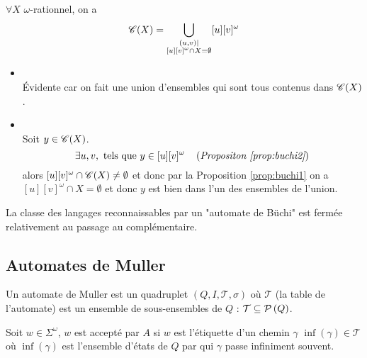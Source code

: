 \begin{theorem}
	$\forall X$ $\omega$-rationnel, on a
	$$ \mathscr{C}(X) = \bigcup_{ \substack{ (u,v) \mid \\ [u][v]^{\omega} \cap X = \emptyset} } [u][v]^{\omega}$$
\end{theorem}

\begin{proofI}
	\begin{itemize}
		\item \fbox{$\supseteq$} \\
		      Évidente car on fait une union d'ensembles qui sont tous contenus dans $\mathscr{C} (X)$.
		\item \fbox{$\subseteq$} \\
		      Soit $y \in \mathscr{C} (X)$.
		      $$\exists u,v,\text{ tels que } y \in [u][v]^{\omega} \quad\left(\textit{Propositon \ref{prop:buchi2}}\right)$$
		      alors $[u][v]^{\omega} \cap \mathscr{C} (X) \neq \emptyset$ et donc par la  Proposition \ref{prop:buchi1}
		      on a $[u][v]^{\omega} \cap X = \emptyset$ et donc $y$ est bien dans l'un des ensembles de l'union.
	\end{itemize}
\end{proofI}

\begin{coro}
	La classe des langages reconnaissables par un "automate de Büchi" est fermée relativement au passage au complémentaire.
\end{coro}


\subsection{Automates de Muller}

\begin{definition}
	Un automate de Muller est un quadruplet $(Q,I, \mathcal T, \sigma)$ où $\mathcal T$ (la table de l'automate) est un ensemble de sous-ensembles
	de $Q$ : $\mathcal T \subseteq \mathcal{P}\left(Q\right)$.

	Soit $w \in \Sigma^{\omega}$, $w$ est accepté par $A$ si $w$ est l'étiquette d'un chemin $\gamma$ \tq $\inf ({\gamma}) \in \mathcal T$ où
	$\inf ({\gamma})$ est l'ensemble d'états de $Q$ par qui $\gamma$ passe infiniment souvent.

\end{definition}


